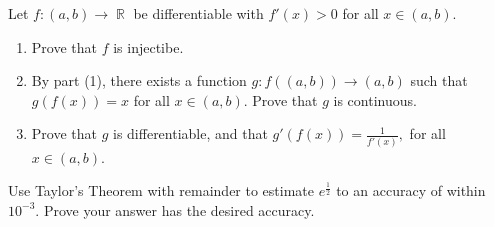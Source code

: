 \documentclass[12pt,letterpaper,boxed]{hmcpset}
\DeclareMathOperator{\R}{\mathbb{R}}
\begin{document}
\begin{solution}

\end{solution}

\begin{problem}[Exercise 1.12]
Let $f: (a,b) \rightarrow \R$ be differentiable with $f'(x) > 0$ for all $x\in(a,b)$.
\begin{enumerate}
    \item Prove that $f$ is injectibe.
    \item By part (1), there exists a function $g : f((a,b))\rightarrow (a,b)$ such that $g(f(x))= x$ for all $x\in(a, b).$ Prove that $g$ is continuous.
    \item Prove that $g$ is differentiable, and that $g'(f(x))= \frac{1}{f'(x)},$ for all $x \in (a,b)$.
\end{enumerate}
\end{problem}

\begin{solution}

\end{solution}

\begin{problem}[Exercise 1.17]
Use Taylor's Theorem with remainder to estimate $e^{\frac{1}{2}}$ to an accuracy of within $10^{-3}.$ Prove your answer has the desired accuracy.
\end{problem}

\begin{solution}

\end{solution}
\end{document}
